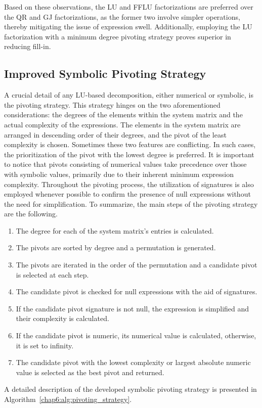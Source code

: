 Based on these observations, the \ac{LU} and \ac{FFLU} factorizations are preferred over the QR and \ac{GJ} factorizations, as the former two involve simpler operations, thereby mitigating the issue of expression swell. Additionally, employing the \ac{LU} factorization with a minimum degree pivoting strategy proves superior in reducing fill-in.

\subsection{Improved Symbolic Pivoting Strategy}

A crucial detail of any \ac{LU}-based decomposition, either numerical or symbolic, is the pivoting strategy. This strategy hinges on the two aforementioned considerations: the degrees of the elements within the system matrix and the actual complexity of the expressions. The elements in the system matrix are arranged in descending order of their degrees, and the pivot of the least complexity is chosen. Sometimes these two features are conflicting. In such cases, the prioritization of the pivot with the lowest degree is preferred. It is important to notice that pivots consisting of numerical values take precedence over those with symbolic values, primarily due to their inherent minimum expression complexity. Throughout the pivoting process, the utilization of signatures is also employed whenever possible to confirm the presence of null expressions without the need for simplification. To summarize, the main steps of the pivoting strategy are the following.
%
\begin{enumerate}
  \item The degree for each of the system matrix's entries is calculated.
  \item The pivots are sorted by degree and a permutation is generated.
  \item The pivots are iterated in the order of the permutation and a candidate pivot is selected at each step.
  \item The candidate pivot is checked for null expressions with the aid of signatures.
  \item If the candidate pivot signature is not null, the expression is simplified and their complexity is calculated.
  \item If the candidate pivot is numeric, its numerical value is calculated, otherwise, it is set to infinity.
  \item The candidate pivot with the lowest complexity or largest absolute numeric value is selected as the best pivot and returned.
\end{enumerate}
%
A detailed description of the developed symbolic pivoting strategy is presented in Algorithm~\ref{chap6:alg:pivoting_strategy}.

